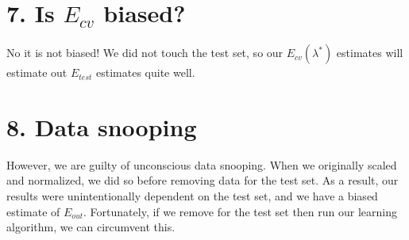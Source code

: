 \documentclass[12pt]{article}
\begin{document}
\section*{7. Is $E_{cv}$ biased?}
No it is not biased! We did not touch the test set, so our $E_{cv}(\lambda^*)$ estimates will estimate out $E_{test}$ estimates quite well.

\section*{8. Data snooping}
However, we are guilty of unconscious data snooping. When we originally scaled and normalized, we did so before removing data for the test set. As a result, our results were unintentionally dependent on the test set, and we have a biased estimate of $E_{out}$. Fortunately, if we remove for the test set then run our learning algorithm, we can circumvent this.
\end{document}
